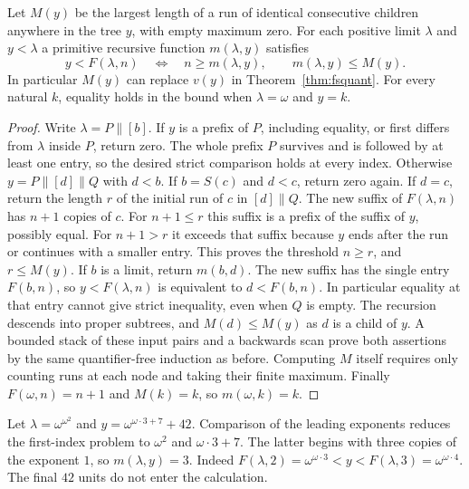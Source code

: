 \begin{corollary}
\label{thm:exact-fs}
Let $M(y)$ be the largest length of a run of identical consecutive
children anywhere in the tree $y$, with empty maximum zero.
For each positive limit $\lambda$ and $y<\lambda$ a primitive recursive
function $m(\lambda,y)$ satisfies
\[
   y<F(\lambda,n)\quad\Longleftrightarrow\quad n\ge m(\lambda,y),
   \qquad m(\lambda,y)\le M(y).
\]
In particular $M(y)$ can replace $v(y)$ in
Theorem~\ref{thm:fsquant}. For every natural $k$, equality holds in
the bound when $\lambda=\omega$ and $y=k$.
\end{corollary}
\begin{proof}
Write $\lambda=P\mathbin{\|}[b]$. If $y$ is a prefix of $P$,
including equality, or first differs from $\lambda$ inside $P$,
return zero. The whole prefix $P$ survives and is followed by at
least one entry, so the desired strict comparison holds at every
index. Otherwise $y=P\mathbin{\|}[d]\mathbin{\|}Q$ with $d<b$.
If $b=S(c)$ and $d<c$, return zero again. If $d=c$, return the length
$r$ of the initial run of $c$ in $[d]\mathbin{\|}Q$. The new suffix
of $F(\lambda,n)$ has $n+1$ copies of $c$. For $n+1\le r$ this suffix
is a prefix of the suffix of $y$, possibly equal. For $n+1>r$ it
exceeds that suffix because $y$ ends after the run or continues with
a smaller entry. This proves the threshold $n\ge r$, and $r\le M(y)$.
If $b$ is a limit, return $m(b,d)$. The new suffix has the single
entry $F(b,n)$, so $y<F(\lambda,n)$ is equivalent to $d<F(b,n)$.
In particular equality at that entry cannot give strict inequality,
even when $Q$ is empty. The recursion descends into proper subtrees, and
$M(d)\le M(y)$ as $d$ is a child of $y$. A bounded stack of these
input pairs and a backwards scan prove both assertions by the same
quantifier-free induction as before. Computing $M$ itself requires
only counting runs at each node and taking their finite maximum.
Finally $F(\omega,n)=n+1$ and $M(k)=k$, so $m(\omega,k)=k$.
\end{proof}

\begin{example}
Let $\lambda=\omega^{\omega^2}$ and $y=\omega^{\omega\cdot3+7}+42$.
Comparison of the leading exponents reduces the first-index problem to
$\omega^2$ and $\omega\cdot3+7$. The latter begins with three copies of
the exponent $1$, so $m(\lambda,y)=3$. Indeed
$F(\lambda,2)=\omega^{\omega\cdot3}<y<F(\lambda,3)=\omega^{\omega\cdot4}$.
The final $42$ units do not enter the calculation.
\end{example}

